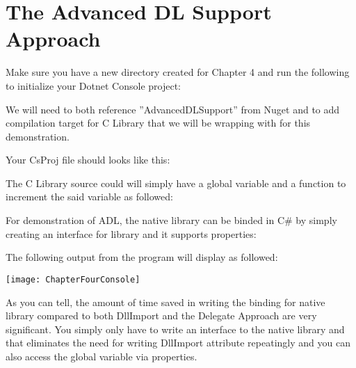 \newpage
\section{The Advanced DL Support Approach}
Make sure you have a new directory created for Chapter 4 and run the following to initialize your Dotnet Console project:



We will need to both reference ''AdvancedDLSupport'' from Nuget and to add compilation target for C Library that we will be wrapping with for this demonstration.

Your CsProj file should looks like this:



The C Library source could will simply have a global variable and a function to increment the said variable as followed:



For demonstration of ADL, the native library can be binded in C\# by simply creating an interface for library and it supports properties:


\newpage
The following output from the program will display as followed:

\texttt{[image: ChapterFourConsole]}

As you can tell, the amount of time saved in writing the binding for native library compared to both DllImport and the Delegate Approach are very significant. You simply only have to write an interface to the native library and that eliminates the need for writing DllImport attribute repeatingly and you can also access the global variable via properties.
